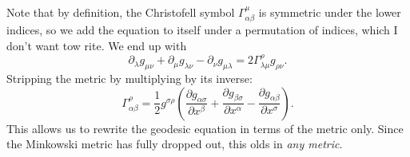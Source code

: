 Note that by definition, the Christofell symbol $\Gamma _{\alpha \beta } ^\mu $ is symmetric under the lower indices, so we add the equation to itself under a permutation of indices, which I don't want tow rite. We end up with
\[
	\partial _\lambda g_{\mu \nu } +\partial _\mu g_{\lambda \nu } -\partial _\nu g_{\mu \lambda } =2\Gamma ^\rho _{\lambda \mu } g_{\rho \nu }  
.\]
Stripping the metric by multiplying by its inverse:
\[
	\Gamma _{\alpha \beta } ^\rho =\frac{1}{2} g^{\sigma \rho } \left( \frac{\partial g_{\alpha \sigma } }{\partial x^\beta } +\frac{\partial g_{\beta \sigma } }{\partial x^\alpha } -\frac{\partial g_{\alpha \beta } }{\partial x^\sigma }  \right) 
.\]
This allows us to rewrite the geodesic equation in terms of the metric only. Since the Minkowski metric has fully dropped out, this olds in \emph{any metric}.
